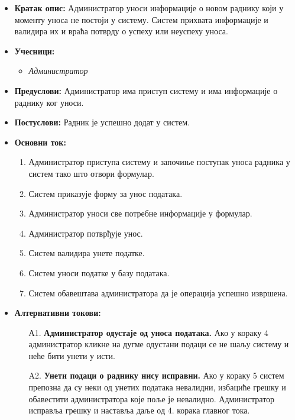 \documentclass{article}
\begin{document}
\begin{itemize}
    \item \textbf{Кратак опис:} Администратор уноси информације о новом раднику који у моменту уноса не постоји у систему. Систем прихвата информације и валидира их и враћа потврду о успеху или неуспеху уноса.
    \item \textbf{Учесници:}
        \begin{itemize}
            \item \textit{Администратор}
        \end{itemize}
    \item \textbf{Предуслови:} Администратор има приступ систему и има информације о раднику ког уноси.
    \item \textbf{Постуслови:} Радник је успешно додат у систем.
    \item \textbf{Основни ток:}
        \begin{enumerate}
            \item Администратор приступа систему и започиње поступак уноса радника у систем тако што отвори формулар.
            \item Систем приказује форму за унос података.
            \item Администратор уноси све потребне информације у формулар.
            \item Администратор потврђује унос.
            \item Систем валидира унете податке.
            \item Систем уноси податке у базу података.
            \item Систем обавештава администратора да је операција успешно извршена.
        \end{enumerate}
    
    \item \textbf{Алтернативни токови:}
        \begin{itemize}
            \item[А1.] \textbf{Администратор одустаје од уноса података.} Ако у кораку 4 администратор кликне на дугме одустани подаци се не шаљу систему и неће бити унети у исти.
            \item[A2.] \textbf{Унети подаци о раднику нису исправни.} Ако у кораку 5 систем препозна да су неки од унетих података невалидни, избациће грешку и обавестити администратора које поље је невалидно. Администратор исправља грешку и наставља даље од 4. корака главног тока. 
        \end{itemize}
\end{itemize}
\end{document}
